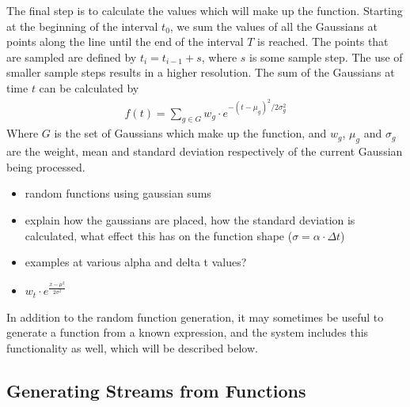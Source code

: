 \documentclass[a4paper,11pt]{article}
\begin{document}
   The final step is to calculate the values which will make up the
   function. Starting at the beginning of the interval $t_0$, we sum the values of
   all the Gaussians at points along the line until the end of the interval $T$ is
   reached. The points that are sampled are defined by $t_i=t_{i-1}+s$, where $s$
   is some sample step. The use of smaller sample steps results in a higher
   resolution. The sum of the Gaussians at time $t$ can be calculated by
   \begin{align}
   f(t) = \sum_{g\in G}w_g\cdot e^{-(t-\mu_g)^2/2\sigma_g^2}
   \end{align}
   Where $G$ is the set of Gaussians which make up the function, and $w_g$, $\mu_g$
   and $\sigma_g$ are the weight, mean and standard deviation respectively of the
   current Gaussian being processed.

\begin{itemize}
\item random functions using gaussian sums
\item explain how the gaussians are placed, how the standard deviation is
  calculated, what effect this has on the function shape
  ($\sigma=\alpha\cdot\Delta t$)
\item examples at various alpha and delta t values?
\item $w_t\cdot e^\frac{{x-\mu}^2}{2\sigma^2}$
\end{itemize}

   In addition to the random function generation, it may sometimes be useful to
   generate a function from a known expression, and the system includes this
   functionality as well, which will be described below.
\subsection{Generating Streams from Functions}
\label{sec-5-2}
\end{document}
